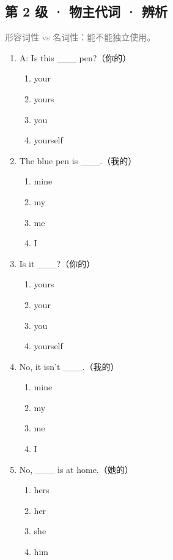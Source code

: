 \documentclass[11pt,a4paper]{ctexart}
\begin{document}
\subsection*{第 2 级 · 物主代词 · 辨析}
\noindent\textcolor{gray}{形容词性 vs 名词性：能不能独立使用。}\par\smallskip
\begin{enumerate}[leftmargin=*,itemsep=4pt]
\item A: Is this \_\_\_ pen?（你的）
\begin{enumerate}[label=\Alph*.,leftmargin=2em,itemsep=1pt,topsep=2pt]
\item your
\item yours
\item you
\item yourself
\end{enumerate}
\item The blue pen is \_\_\_.（我的）
\begin{enumerate}[label=\Alph*.,leftmargin=2em,itemsep=1pt,topsep=2pt]
\item mine
\item my
\item me
\item I
\end{enumerate}
\item Is it \_\_\_?（你的）
\begin{enumerate}[label=\Alph*.,leftmargin=2em,itemsep=1pt,topsep=2pt]
\item yours
\item your
\item you
\item yourself
\end{enumerate}
\item No, it isn’t \_\_\_.（我的）
\begin{enumerate}[label=\Alph*.,leftmargin=2em,itemsep=1pt,topsep=2pt]
\item mine
\item my
\item me
\item I
\end{enumerate}
\item No, \_\_\_ is at home.（她的）
\begin{enumerate}[label=\Alph*.,leftmargin=2em,itemsep=1pt,topsep=2pt]
\item hers
\item her
\item she
\item him
\end{enumerate}

\end{enumerate}
\end{document}
